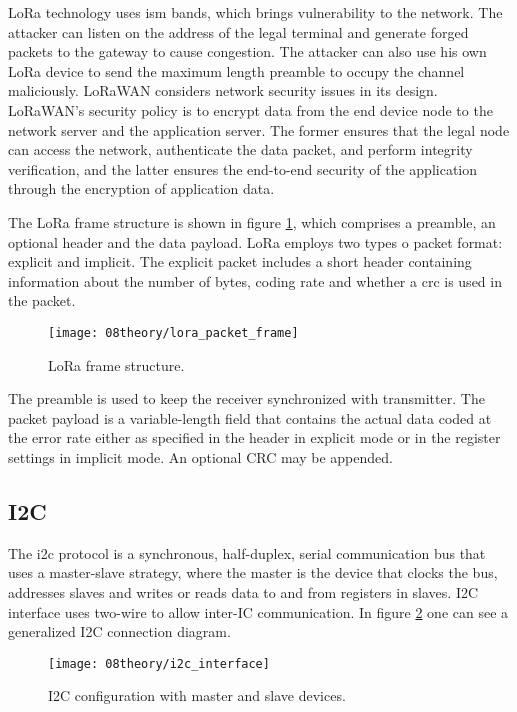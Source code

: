 LoRa technology uses \ac{ism} bands, which brings vulnerability to the network. The attacker can listen on the address of the legal terminal and generate forged packets to the gateway to cause congestion. The attacker can also use his own LoRa device to send the maximum length preamble to occupy the channel maliciously. LoRaWAN considers network security issues in its design. LoRaWAN’s security policy is to encrypt data from the end device node to the network server and the application server. The former ensures that the legal node can access the network, authenticate the data packet, and perform integrity verification, and the latter ensures the end-to-end security of the application through the encryption of application data. \cite{lora_physical_layer}

The LoRa frame structure is shown in figure \ref{fig:lora_packet_frame}, which comprises a preamble, an optional header and the data payload. LoRa employs two types o packet format: explicit and implicit. The explicit packet includes a short header containing information about the number of bytes, coding rate and whether a \ac{crc} is used in the packet.

\begin{figure}[H]
	\centering
	\texttt{[image: 08theory/lora\_packet\_frame]}
	\caption{LoRa frame structure.}
	\label{fig:lora_packet_frame}
\end{figure}

The preamble is used to keep the receiver synchronized with transmitter. The packet payload is a variable-length field that contains the actual data coded at the error rate either as specified in the header  in  explicit  mode  or  in  the  register  settings  in  implicit  mode. An  optional  CRC  may  be  appended. 

\clearpage
\subsection{I2C}
The \ac{i2c} protocol is a synchronous, half-duplex, serial communication bus that uses a master-slave strategy, where the master is the device that clocks the bus, addresses slaves and writes or reads data to and from registers in slaves. I2C interface uses two-wire to allow inter-IC communication. In figure \ref{fig:i2c_interface} one can see a generalized I2C connection diagram. \cite{i2c_interface}

\begin{figure}[H]
	\centering
	\texttt{[image: 08theory/i2c\_interface]}
	\caption{I2C configuration with master and slave devices.}
	\label{fig:i2c_interface}
\end{figure}

